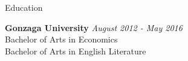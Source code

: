 \documentclass{resume} %
\begin{document}

\begin{rSection}{Education}

{\bf Gonzaga University} \hfill {\em August 2012 - May 2016} \\ 
Bachelor of Arts in Economics \\
Bachelor of Arts in English Literature \smallskip \\

\end{rSection}

\end{document}
